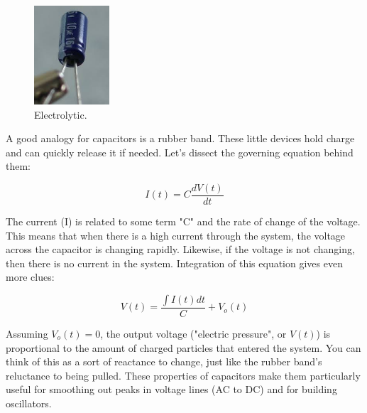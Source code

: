 \documentclass[a4paper]{article}
\begin{document}
\begin{figure}
  \begin{center}
    \includegraphics[width=0.25\textwidth]{electrolytic_cap.jpeg}
  \end{center}
  \caption{\label{fig:electrlytic}Electrolytic.}
\end{figure}

A good analogy for capacitors is a rubber band. These little devices hold charge and can quickly release it if needed. Let's dissect the governing equation behind them:

\begin{equation} \label{capacitance}
I(t) = C\frac{dV(t)}{dt}
\end{equation}

\vspace{0.2cm}
The current (I) is related to some term "C" and the rate of change of the voltage. This means that when there is a high current through the system, the voltage across the capacitor is changing rapidly. Likewise, if the voltage is not changing, then there is no current in the system. Integration of this equation gives even more clues:

\begin{equation} \label{eq:capacitance_init}
V(t) = \frac{\int I(t)dt}{C}+V_o(t)
\end{equation}
\vspace{0.2cm}

Assuming {$V_o(t) = 0$}, the output voltage ("electric pressure", or $V(t)$) is proportional to the amount of charged particles that entered the system. You can think of this as a sort of reactance to change, just like the rubber band's reluctance to being pulled. These properties of capacitors make them particularly useful for smoothing out peaks in voltage lines (AC to DC) and for building oscillators.
\end{document}
